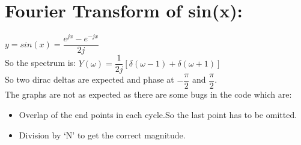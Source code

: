 \documentclass[11pt]{article}
\begin{document}
    \hypertarget{fourier-transform-of-sinx}{%
\section{Fourier Transform of sin(x):}\label{fourier-transform-of-sinx}}

\(y=sin(x)=\dfrac{e^{jx}-e^{-jx}}{2j}\) \\So the spectrum is:
\(Y(\omega)=\dfrac{1}{2j}[\delta(\omega -1)+\delta(\omega +1)]\) \\So two
dirac deltas are expected and phase at \(-\dfrac{\pi}{2}\) and
\(\dfrac{\pi}{2}\).\\

    The graphs are not as expected as there are some bugs in the code which
are: \begin{itemize} \item Overlap of the end points in each cycle.So the last point has to
be omitted. \item Division by `N' to get the correct magnitude.
\end{itemize}
    

    
    \begin{center}
    \end{center}
    { \hspace*{\fill} \\}
    
\end{document}
